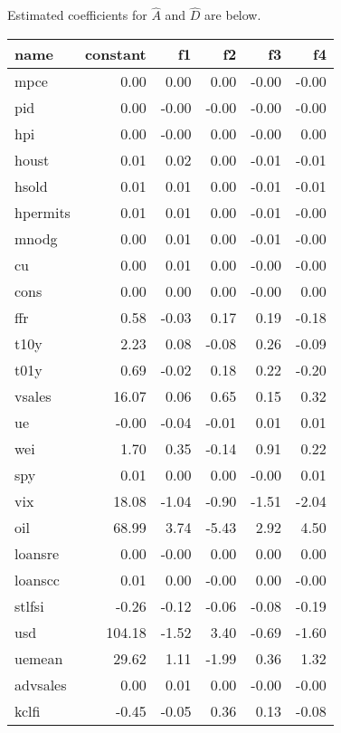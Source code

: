 \documentclass[11pt, letterpaper]{article}\usepackage[]{graphicx}\usepackage[]{color}
\begin{document}
Estimated coefficients for $\widehat{A}$ and $\widehat{D}$ are below.
\begin{table}[H]
\centering
\begingroup\footnotesize
\begin{tabular}{lrrrrr}
  \hline
name & constant & f1 & f2 & f3 & f4 \\ 
  \hline
mpce & 0.00 & 0.00 & 0.00 & -0.00 & -0.00 \\ 
  pid & 0.00 & -0.00 & -0.00 & -0.00 & -0.00 \\ 
  hpi & 0.00 & -0.00 & 0.00 & -0.00 & 0.00 \\ 
  houst & 0.01 & 0.02 & 0.00 & -0.01 & -0.01 \\ 
  hsold & 0.01 & 0.01 & 0.00 & -0.01 & -0.01 \\ 
  hpermits & 0.01 & 0.01 & 0.00 & -0.01 & -0.00 \\ 
  mnodg & 0.00 & 0.01 & 0.00 & -0.01 & -0.00 \\ 
  cu & 0.00 & 0.01 & 0.00 & -0.00 & -0.00 \\ 
  cons & 0.00 & 0.00 & 0.00 & -0.00 & 0.00 \\ 
  ffr & 0.58 & -0.03 & 0.17 & 0.19 & -0.18 \\ 
  t10y & 2.23 & 0.08 & -0.08 & 0.26 & -0.09 \\ 
  t01y & 0.69 & -0.02 & 0.18 & 0.22 & -0.20 \\ 
  vsales & 16.07 & 0.06 & 0.65 & 0.15 & 0.32 \\ 
  ue & -0.00 & -0.04 & -0.01 & 0.01 & 0.01 \\ 
  wei & 1.70 & 0.35 & -0.14 & 0.91 & 0.22 \\ 
  spy & 0.01 & 0.00 & 0.00 & -0.00 & 0.01 \\ 
  vix & 18.08 & -1.04 & -0.90 & -1.51 & -2.04 \\ 
  oil & 68.99 & 3.74 & -5.43 & 2.92 & 4.50 \\ 
  loansre & 0.00 & -0.00 & 0.00 & 0.00 & 0.00 \\ 
  loanscc & 0.01 & 0.00 & -0.00 & 0.00 & -0.00 \\ 
  stlfsi & -0.26 & -0.12 & -0.06 & -0.08 & -0.19 \\ 
  usd & 104.18 & -1.52 & 3.40 & -0.69 & -1.60 \\ 
  uemean & 29.62 & 1.11 & -1.99 & 0.36 & 1.32 \\ 
  advsales & 0.00 & 0.01 & 0.00 & -0.00 & -0.00 \\ 
  kclfi & -0.45 & -0.05 & 0.36 & 0.13 & -0.08 \\ 

\end{tabular}
\end{table}
\end{document}
